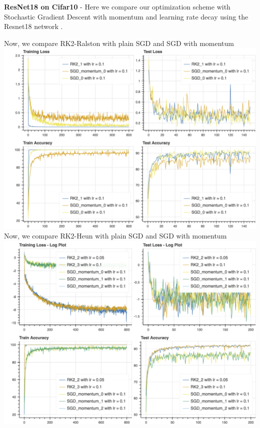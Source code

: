 \textbf{ResNet18 on Cifar10} -
Here we compare our optimization scheme with Stochastic Gradient Descent with momentum and learning rate decay using the Resnet18 network \cite{bl_1}.

Now, we compare RK2-Ralston with plain SGD and SGD with momentum
\\
\includegraphics[scale=0.4]{plots/plots_1/resnet_1.png}
\\
Now, we compare RK2-Heun with plain SGD and SGD with momentum
\\
\includegraphics[scale=0.4]{plots/inf_plots/resnet_sgd_rk2.png}
